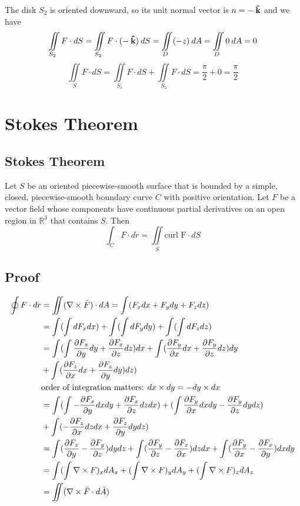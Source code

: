 The disk $S_2$ is oriented downward, so its unit normal vector is $n=-\:\boldsymbol{\hat{\textbf{k}}}$ and we have
$$\iint\limits_{S_2} F\cdot dS=\iint\limits_{S_2} F\cdot(-\:\boldsymbol{\hat{\textbf{k}}})\:dS=\iint\limits_D
        (-z)\:dA=\iint\limits_D 0\:dA=0$$
$$\iint\limits_S F\cdot dS=\iint\limits_{S_1}F\cdot dS+\iint\limits_{S_2}F\cdot dS=
        \frac{\pi}{2}+0=\frac{\pi}{2}$$

\section{Stokes Theorem}

\subsection*{Stokes Theorem}
Let  $S$ be an oriented piecewise-smooth surface that is bounded by a simple, closed,
piecewise-smooth boundary curve $C$ with positive orientation. Let $F$ be a vector
field whose components have continuous partial derivatives on an open region in
$\mathbb{R}^3$ that contains $S$. Then
$$\int_C F\cdot dr=\iint\limits_S \text{curl F}\cdot dS$$

\subsection*{Proof}
\begin{align*}
        \oint F\cdot dr & =\iint(\nabla\times\bar{F})\cdot dA=\int(F_xdx+F_ydy+F_zdz)                                                  \\
                        & =\int(\int dF_xdx)+\int(\int dF_ydy)+\int(\int dF_zdz)                                                       \\
                        & =\int(\int \pdv{F_x}{y}dy+\pdv{F_x}{z}dz)dx+\int(\pdv{F_y}{x}dx+\pdv{F_y}{z}dz)dy                            \\
                        & +\int(\pdv{F_z}{x}dx+\pdv{F_z}{y}dy)dz)                                                                      \\
                        & \text{order of integration matters: }dx\times dy=-dy\times dx                                                \\
                        & =\int(\int-\pdv{F_x}{y}dxdy+\pdv{F_x}{z}dzdx)+(\int\pdv{F_y}{x}dxdy-\pdv{F_y}{z}dydz)                        \\
                        & +\int(-\pdv{F_z}{x}dzdx+\pdv{F_z}{y}dydz)                                                                    \\
                        & =\int(\pdv{F_z}{y}-\pdv{F_y}{z})dydz+\int(\pdv{F_y}{z}-\pdv{F_z}{x})dzdx+\int(\pdv{F_y}{x}-\pdv{F_x}{y})dxdy \\
                        & =\int(\int \nabla\times F)_x dA_x + (\int \nabla\times F)_y dA_y + (\int \nabla\times F)_z dA_z              \\
                        & =\iint(\nabla\times\bar{F}\cdot d\bar{A})
\end{align*}

